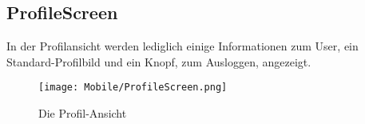 \subsection{ProfileScreen}
In der Profilansicht werden lediglich einige Informationen zum User, ein Standard-Profilbild und
ein Knopf, zum Ausloggen, angezeigt.

\begin{figure}[H]
  \begin{center}
    \texttt{[image: Mobile/ProfileScreen.png]}
    \caption{Die Profil-Ansicht}
  \end{center}
\end{figure}

